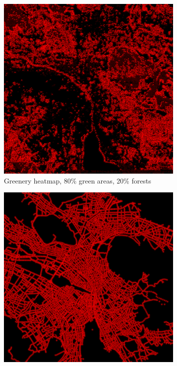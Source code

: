 \documentclass[letterpaper]{article}
\begin{document}
\begin{figure}[H]
    \centering
    \begin{subfigure}[t]{.45\columnwidth}
        \centering
        \includegraphics[width=\linewidth]{images/greenery/combined_heatmap_smoothed_4_to_1.png}
        \caption[width=.9\linewidth]{Greenery heatmap, 80\% green areas, 20\% forests}
    \end{subfigure}\hspace{0.05\columnwidth}
    \begin{subfigure}[t]{.45\columnwidth}
        \centering
        \includegraphics[width=\linewidth]{images/results/illumination_heatmap_70.png}

\end{subfigure}
\end{figure}
\end{document}
